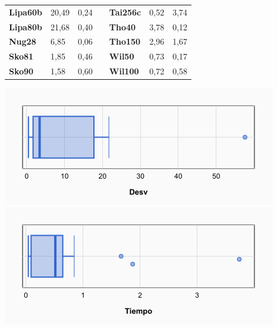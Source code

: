 \documentclass[a4paper, 12pt]{article}
\begin{document}
\begin{table}[H]
\begin{tabular}{|l|l|l|l|l|l|l|}
\textbf{Lipa60b}                    & 20,49                              & 0,24                                 &                                & \textbf{Tai256c}                   & 0,52                               & 3,74                                 \\ \cline{1-3} \cline{5-7} 
\textbf{Lipa80b}                    & 21,68                              & 0,40                                 &                                & \textbf{Tho40}                     & 3,78                               & 0,12                                 \\ \cline{1-3} \cline{5-7} 
\textbf{Nug28}                      & 6,85                               & 0,06                                 &                                & \textbf{Tho150}                    & 2,96                               & 1,67                                 \\ \cline{1-3} \cline{5-7} 
\textbf{Sko81}                      & 1,85                               & 0,46                                 &                                & \textbf{Wil50}                     & 0,73                               & 0,17                                 \\ \cline{1-3} \cline{5-7} 
\textbf{Sko90}                      & 1,58                               & 0,60                                 &                                & \textbf{Wil100}                    & 0,72                               & 0,58                                 \\ \cline{1-3} \cline{5-7} 
\end{tabular}
\end{table}

\begin{center}
         \includegraphics[scale=0.42]{boxplot-am(1-1)-desv}
         \includegraphics[scale=0.42]{boxplot-am(1-1)-time}
      \end{center}
      
\end{document}
